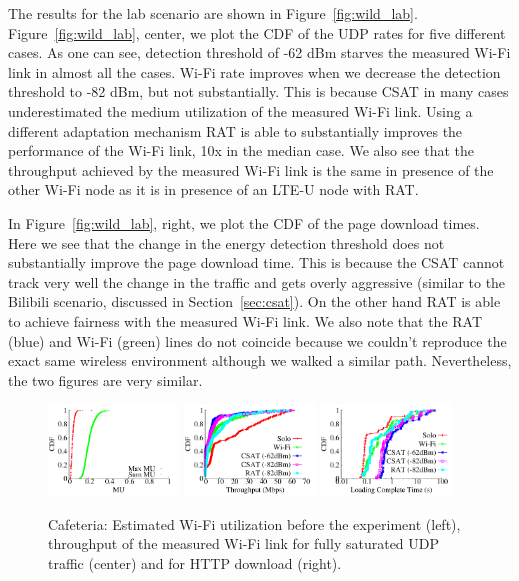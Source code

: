 The results for the lab scenario are shown in Figure~\ref{fig:wild_lab}. 
Figure~\ref{fig:wild_lab}, center, we plot the CDF of the UDP rates for five different cases. 
As one can see, detection threshold of -62 dBm starves the measured Wi-Fi link in almost all the cases. 
Wi-Fi rate improves when we decrease the detection threshold to -82 dBm, but not substantially. 
This is because CSAT in many cases underestimated the medium utilization of the measured Wi-Fi link. 
Using a different adaptation mechanism RAT is able to substantially improves the performance of the Wi-Fi link, 10x in the median case. 
We also see that the throughput achieved by the measured Wi-Fi link is the same in presence of the other Wi-Fi node as it is in presence of an LTE-U node with RAT. 

In Figure~\ref{fig:wild_lab}, right, we plot the CDF of the page download times. Here we see that the change in the energy detection threshold does not substantially improve the page download time. This is because the CSAT cannot track very well the change in the traffic and gets overly aggressive (similar to the Bilibili scenario, discussed in Section~\ref{sec:csat}). On the other hand RAT is able to achieve fairness with the measured Wi-Fi link. 
We also note that the RAT (blue) and Wi-Fi (green) lines do not coincide because we couldn't reproduce the exact same wireless environment although we walked a similar path. Nevertheless, the two figures are very similar.


\begin{figure}[htb!]
 \centering
    \includegraphics[width=0.31\textwidth]{./figures/union_mu}
    \includegraphics[width=0.31\textwidth]{./figures/unionsouth}
    \includegraphics[width=0.31\textwidth]{./figures/httpunion}
 \caption{Cafeteria: Estimated Wi-Fi utilization before the experiment (left), throughput of the measured Wi-Fi link for fully saturated UDP traffic (center) and for HTTP download (right).}
  \label{fig:wild_cafe}
\end{figure}

